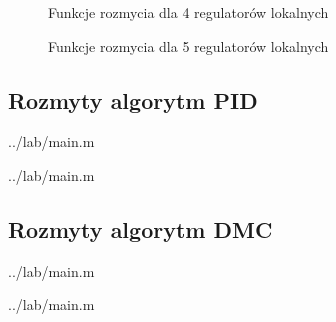 \begin{figure}[H] 
    \centering
    
    \caption{Funkcje rozmycia dla 4 regulatorów lokalnych}
    \label{lab:zad4:fuzzyFunction:4:figure}
\end{figure}

\begin{figure}[H] 
    \centering
    
    \caption{Funkcje rozmycia dla 5 regulatorów lokalnych}
    \label{lab:zad4:fuzzyFunction:5:figure}
\end{figure}

\newpage

\subsection{Rozmyty algorytm PID}
\label{projekt:zad5:PID}


    {../lab/main.m}


    {../lab/main.m}


\newpage

\subsection{Rozmyty algorytm DMC}
\label{projekt:zad5:DMC}



    {../lab/main.m}


    {../lab/main.m}

\newpage
